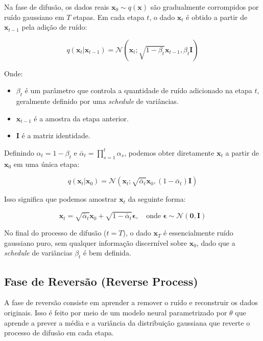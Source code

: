 \documentclass{article}
\begin{document}
Na fase de difusão, os dados reais $\mathbf{x}_0 \sim q(\mathbf{x})$ são gradualmente corrompidos por ruído gaussiano em $T$ etapas. Em cada etapa $t$, o dado $\mathbf{x}_t$ é obtido a partir de $\mathbf{x}_{t-1}$ pela adição de ruído:

\begin{equation}
    q(\mathbf{x}_t | \mathbf{x}_{t-1}) = \mathcal{N}(\mathbf{x}_t; \sqrt{1 - \beta_t} \mathbf{x}_{t-1}, \beta_t \mathbf{I})
\end{equation}

Onde:
\begin{itemize}
    \item $\beta_t$ é um parâmetro que controla a quantidade de ruído adicionado na etapa $t$, geralmente definido por uma \textit{schedule} de variâncias.
    \item $\mathbf{x}_{t-1}$ é a amostra da etapa anterior.
    \item $\mathbf{I}$ é a matriz identidade.
\end{itemize}

Definindo $\alpha_t = 1 - \beta_t$ e $\bar{\alpha}_t = \prod_{s=1}^t \alpha_s$, podemos obter diretamente $\mathbf{x}_t$ a partir de $\mathbf{x}_0$ em uma única etapa:

\begin{equation}
    q(\mathbf{x}_t | \mathbf{x}_0) = \mathcal{N}(\mathbf{x}_t; \sqrt{\bar{\alpha}_t} \mathbf{x}_0, (1 - \bar{\alpha}_t) \mathbf{I})
\end{equation}

Isso significa que podemos amostrar $\mathbf{x}_t$ da seguinte forma:

\begin{equation}
    \mathbf{x}_t = \sqrt{\bar{\alpha}_t} \mathbf{x}_0 + \sqrt{1 - \bar{\alpha}_t} \boldsymbol{\epsilon}, \quad \text{onde } \boldsymbol{\epsilon} \sim \mathcal{N}(\mathbf{0}, \mathbf{I})
\end{equation}

No final do processo de difusão ($t = T$), o dado $\mathbf{x}_T$ é essencialmente ruído gaussiano puro, sem qualquer informação discernível sobre $\mathbf{x}_0$, dado que a \textit{schedule} de variâncias $\beta_t$ é bem definida.

\subsection{Fase de Reversão (Reverse Process)}

A fase de reversão consiste em aprender a remover o ruído e reconstruir os dados originais. Isso é feito por meio de um modelo neural parametrizado por $\theta$ que aprende a prever a média e a variância da distribuição gaussiana que reverte o processo de difusão em cada etapa.
\end{document}
